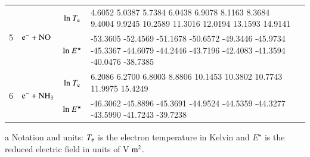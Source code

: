 \begin{table}[!htbp]
\begin{threeparttable}
\begin{tabular*}{\textwidth}{l@{\extracolsep{\fill}}lcll}
  \multirow{2}{*}{5} &  \multirow{2}{*}{ $\rm e^- + NO  $   } & ${\rm ln}~T_{\rm e}$  & \tiny    4.6052    5.0387    5.7384    6.0438    6.9078    8.1163    8.3684    9.4004    9.9245   10.2589   11.3016   12.0194   13.1593   14.9141
 \\
  &  & ${\rm ln}~E^\star$     & \tiny    -53.3605  -52.4569  -51.1678  -50.6572  -49.3446  -45.9734  -45.3367  -44.6079  -44.2446  -43.7196  -42.4083  -41.3594  -40.0476  -38.7385
  \\     
  \midrule  
        
  \multirow{2}{*}{6} &  \multirow{2}{*}{ $\rm e^- + NH_3  $   } & ${\rm ln}~T_{\rm e}$  & \tiny 6.2086    6.2700    6.8003    8.8806   10.1453   10.3802   10.7743   11.9975   15.4249   \\
  
  &  & ${\rm ln}~E^\star$     & \tiny   -46.3062  -45.8896  -45.3691  -44.9524  -44.5359  -44.3277  -43.5990  -41.7243  -39.7238  \\
  
  
                       
    \bottomrule
    \end{tabular*}
\begin{tablenotes}
\item[{a}] Notation and units: $T_{\rm e}$ is the electron temperature in Kelvin and $E^\star$ is the reduced electric field in units of V$\rm ~m^2$.
\end{tablenotes}
   \end{threeparttable}
\end{table}

